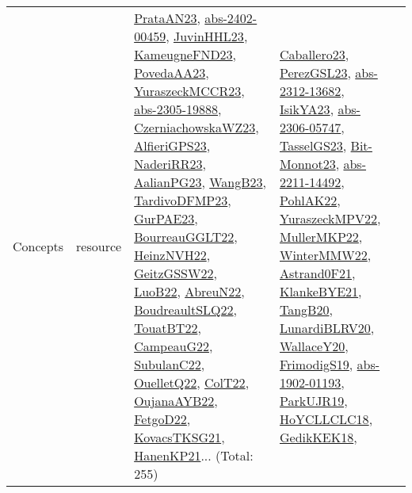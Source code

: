 {\begin{longtable}{lp{3cm}>{\raggedright}p{6cm}>{\raggedright}p{6cm}p{8cm}}
Concepts & resource & \href{articles/PrataAN23.pdf}{PrataAN23}\cite{PrataAN23}, \href{articles/abs-2402-00459.pdf}{abs-2402-00459}\cite{abs-2402-00459}, \href{papers/JuvinHHL23.pdf}{JuvinHHL23}\cite{JuvinHHL23}, \href{papers/KameugneFND23.pdf}{KameugneFND23}\cite{KameugneFND23}, \href{papers/PovedaAA23.pdf}{PovedaAA23}\cite{PovedaAA23}, \href{articles/YuraszeckMCCR23.pdf}{YuraszeckMCCR23}\cite{YuraszeckMCCR23}, \href{articles/abs-2305-19888.pdf}{abs-2305-19888}\cite{abs-2305-19888}, \href{articles/CzerniachowskaWZ23.pdf}{CzerniachowskaWZ23}\cite{CzerniachowskaWZ23}, \href{articles/AlfieriGPS23.pdf}{AlfieriGPS23}\cite{AlfieriGPS23}, \href{articles/NaderiRR23.pdf}{NaderiRR23}\cite{NaderiRR23}, \href{papers/AalianPG23.pdf}{AalianPG23}\cite{AalianPG23}, \href{papers/WangB23.pdf}{WangB23}\cite{WangB23}, \href{papers/TardivoDFMP23.pdf}{TardivoDFMP23}\cite{TardivoDFMP23}, \href{articles/GurPAE23.pdf}{GurPAE23}\cite{GurPAE23}, \href{articles/BourreauGGLT22.pdf}{BourreauGGLT22}\cite{BourreauGGLT22}, \href{articles/HeinzNVH22.pdf}{HeinzNVH22}\cite{HeinzNVH22}, \href{papers/GeitzGSSW22.pdf}{GeitzGSSW22}\cite{GeitzGSSW22}, \href{papers/LuoB22.pdf}{LuoB22}\cite{LuoB22}, \href{articles/AbreuN22.pdf}{AbreuN22}\cite{AbreuN22}, \href{papers/BoudreaultSLQ22.pdf}{BoudreaultSLQ22}\cite{BoudreaultSLQ22}, \href{papers/TouatBT22.pdf}{TouatBT22}\cite{TouatBT22}, \href{articles/CampeauG22.pdf}{CampeauG22}\cite{CampeauG22}, \href{articles/SubulanC22.pdf}{SubulanC22}\cite{SubulanC22}, \href{papers/OuelletQ22.pdf}{OuelletQ22}\cite{OuelletQ22}, \href{articles/ColT22.pdf}{ColT22}\cite{ColT22}, \href{papers/OujanaAYB22.pdf}{OujanaAYB22}\cite{OujanaAYB22}, \href{articles/FetgoD22.pdf}{FetgoD22}\cite{FetgoD22}, \href{papers/KovacsTKSG21.pdf}{KovacsTKSG21}\cite{KovacsTKSG21}, \href{papers/HanenKP21.pdf}{HanenKP21}\cite{HanenKP21}... (Total: 255) & \href{articles/Caballero23.pdf}{Caballero23}\cite{Caballero23}, \href{papers/PerezGSL23.pdf}{PerezGSL23}\cite{PerezGSL23}, \href{articles/abs-2312-13682.pdf}{abs-2312-13682}\cite{abs-2312-13682}, \href{articles/IsikYA23.pdf}{IsikYA23}\cite{IsikYA23}, \href{articles/abs-2306-05747.pdf}{abs-2306-05747}\cite{abs-2306-05747}, \href{papers/TasselGS23.pdf}{TasselGS23}\cite{TasselGS23}, \href{papers/Bit-Monnot23.pdf}{Bit-Monnot23}\cite{Bit-Monnot23}, \href{articles/abs-2211-14492.pdf}{abs-2211-14492}\cite{abs-2211-14492}, \href{articles/PohlAK22.pdf}{PohlAK22}\cite{PohlAK22}, \href{articles/YuraszeckMPV22.pdf}{YuraszeckMPV22}\cite{YuraszeckMPV22}, \href{articles/MullerMKP22.pdf}{MullerMKP22}\cite{MullerMKP22}, \href{papers/WinterMMW22.pdf}{WinterMMW22}\cite{WinterMMW22}, \href{papers/Astrand0F21.pdf}{Astrand0F21}\cite{Astrand0F21}, \href{papers/KlankeBYE21.pdf}{KlankeBYE21}\cite{KlankeBYE21}, \href{papers/TangB20.pdf}{TangB20}\cite{TangB20}, \href{articles/LunardiBLRV20.pdf}{LunardiBLRV20}\cite{LunardiBLRV20}, \href{articles/WallaceY20.pdf}{WallaceY20}\cite{WallaceY20}, \href{papers/FrimodigS19.pdf}{FrimodigS19}\cite{FrimodigS19}, \href{articles/abs-1902-01193.pdf}{abs-1902-01193}\cite{abs-1902-01193}, \href{papers/ParkUJR19.pdf}{ParkUJR19}\cite{ParkUJR19}, \href{papers/HoYCLLCLC18.pdf}{HoYCLLCLC18}\cite{HoYCLLCLC18}, \href{articles/GedikKEK18.pdf}{GedikKEK18}\cite{GedikKEK18}, 
\end{longtable}}
